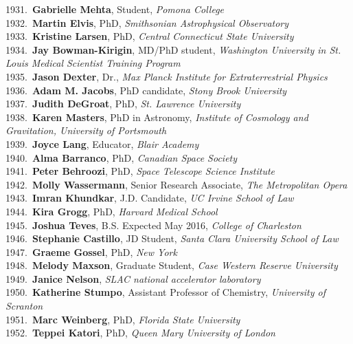1931.~{\bf Gabrielle Mehta}, Student, {\sl Pomona College} \\
1932.~{\bf Martin Elvis}, PhD, {\sl Smithsonian Astrophysical Observatory} \\
1933.~{\bf Kristine Larsen}, PhD, {\sl Central Connecticut State University} \\
1934.~{\bf Jay Bowman-Kirigin}, MD/PhD student, {\sl Washington University in St. Louis Medical Scientist Training Program} \\
1935.~{\bf Jason Dexter}, Dr., {\sl Max Planck Institute for Extraterrestrial Physics} \\
1936.~{\bf Adam M. Jacobs}, PhD candidate, {\sl Stony Brook University} \\
1937.~{\bf Judith DeGroat}, PhD, {\sl St. Lawrence University} \\
1938.~{\bf Karen Masters}, PhD in Astronomy, {\sl Institute of Cosmology and Gravitation, University of Portsmouth} \\
1939.~{\bf Joyce Lang}, Educator, {\sl Blair Academy} \\
1940.~{\bf Alma Barranco}, PhD, {\sl Canadian Space Society} \\
1941.~{\bf Peter Behroozi}, PhD, {\sl Space Telescope Science Institute} \\
1942.~{\bf Molly Wassermann}, Senior Research Associate, {\sl The Metropolitan Opera} \\
1943.~{\bf Imran Khundkar}, J.D. Candidate, {\sl UC Irvine School of Law} \\
1944.~{\bf Kira Grogg}, PhD, {\sl Harvard Medical School } \\
1945.~{\bf Joshua Teves}, B.S. Expected May 2016, {\sl College of Charleston} \\
1946.~{\bf Stephanie Castillo}, JD Student, {\sl Santa Clara University School of Law} \\
1947.~{\bf Graeme Gossel}, PhD, {\sl New York} \\
1948.~{\bf Melody Maxson}, Graduate Student, {\sl Case Western Reserve University} \\
1949.~{\bf Janice Nelson}, {\sl SLAC national accelerator laboratory} \\
1950.~{\bf Katherine Stumpo}, Assistant Professor of Chemistry, {\sl University of Scranton} \\
1951.~{\bf Marc Weinberg}, PhD, {\sl Florida State University} \\
1952.~{\bf Teppei Katori}, PhD, {\sl Queen Mary University of London} \\

